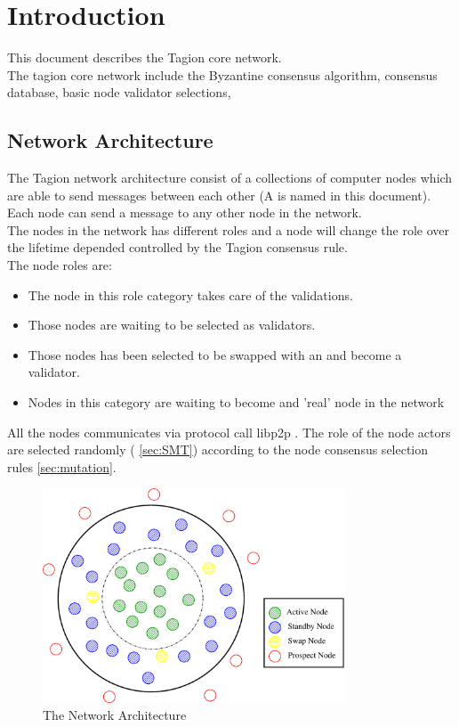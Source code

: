 \section{Introduction}

This document describes the Tagion core network.\\
The tagion core network include the Byzantine consensus algorithm, consensus database, basic node validator selections, 

\subsection{Network Architecture}
The Tagion network architecture consist of a collections of computer nodes which are able to send messages between each other (A  is named  in this document). Each node can send a message to any other node in the network.\\
The nodes in the network has different roles and a node will change the role over the lifetime depended controlled by the Tagion consensus rule.\\ 

The node roles are:
\begin{itemize}
	\item[\bfit{Active Node}] The node in this role category takes care of the validations.
	\item[\bfit{Standby Node}] Those nodes are waiting to be selected  as validators.
	\item[\bfit{Swap Node}] Those nodes has been selected to be swapped with an  and become a validator.  
	\item[\bfit{Prospect Node}] Nodes in this category are waiting to become and 'real' node in the network 
	\label{tab:node_roles}
\end{itemize}

All the nodes communicates via protocol call libp2p \cite{libp2p}. The role of the node actors are selected randomly ( \cref{sec:SMT}) according to the node consensus selection rules \cref{sec:mutation}.

\begin{figure}[H]
	\centering
	\includegraphics[width=0.8\textwidth]{fig/network_architecture.eps}
	\caption{The Network Architecture}
	\label{fig:network_architecture}
\end{figure}

